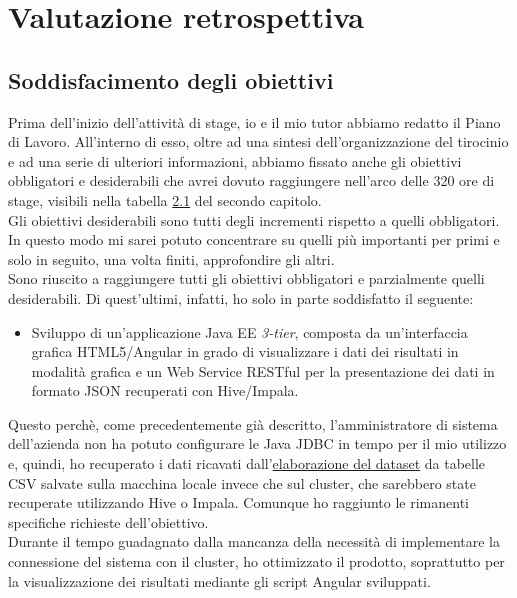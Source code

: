 
\chapter{Valutazione retrospettiva}
\label{cap:valutazione-retrospettiva}

\section{Soddisfacimento degli obiettivi}
Prima dell'inizio dell'attività di stage, io e il mio tutor abbiamo redatto il Piano di Lavoro. All'interno di esso, oltre ad una sintesi dell'organizzazione del tirocinio e ad una serie di ulteriori informazioni, abbiamo fissato anche gli obiettivi obbligatori e desiderabili che avrei dovuto raggiungere nell'arco delle 320 ore di stage, visibili nella tabella \hyperref[obiettivi_stage]{2.1} del secondo capitolo.\\
Gli obiettivi desiderabili sono tutti degli incrementi rispetto a quelli obbligatori. In questo modo mi sarei potuto concentrare su quelli più importanti per primi e solo in seguito, una volta finiti, approfondire gli altri.\\ 
Sono riuscito a raggiungere tutti gli obiettivi obbligatori e parzialmente quelli desiderabili. Di quest'ultimi, infatti, ho solo in parte soddisfatto il seguente:
\begin{itemize}
	\item Sviluppo di un'applicazione Java EE \textit{3-tier}, composta da un'interfaccia grafica HTML5/Angular in grado di visualizzare i dati dei risultati in modalità grafica e un Web Service RESTful per la presentazione dei dati in formato JSON recuperati con Hive/Impala.
\end{itemize}
Questo perchè, come precedentemente già descritto, l'amministratore di sistema dell'azienda non ha potuto configurare le \gls{Java JDBC} in tempo per il mio utilizzo e, quindi, ho recuperato i dati ricavati dall'\hyperref[dataset]{elaborazione del dataset} da tabelle \gls{CSV} salvate sulla macchina locale invece che sul \gls{cluster}, che sarebbero state recuperate utilizzando Hive o Impala. Comunque ho raggiunto le rimanenti specifiche richieste dell'obiettivo. \\
Durante il tempo guadagnato dalla mancanza della necessità di implementare la connessione del sistema con il \gls{cluster}, ho ottimizzato il prodotto, soprattutto per la visualizzazione dei risultati mediante gli script Angular sviluppati.

